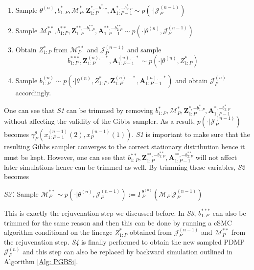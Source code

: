 \documentclass[12pt,a4paper]{article}
\begin{document}
\begin{enumerate}[label=\textit{S\arabic*.},leftmargin=*]
    \item Sample \(\theta^{(n)},b_{1:P}^{*},\mathcal{M}_{P}^{*},\mathbf{Z}_{1:P}^{*,-b_{1:P}^{*}},\mathbf{A}_{1:P-1}^{*,-b_{2:P}^{*}} \sim p(\cdot|\mathcal{J}_P^{(n-1)})\)
    \item Sample \(\mathcal{M}_{P}^{**},b_{1:P}^{**},\mathbf{Z}_{1:P}^{**,-b_{1:P}^{**}},\mathbf{A}_{1:P-1}^{**,-b_{2:P}^{**}} \sim p(\cdot|\theta^{(n)},\mathcal{J}_{P}^{(n-1)})\)
    \item Obtain \(Z_{1:P}^{*}\) from \(\mathcal{M}_{P}^{**}\) and \(\mathcal{J}_{P}^{(n-1)}\) and sample \[b_{1:P}^{***},\mathbf{Z}_{1:P}^{(n),-*},\mathbf{A}_{1:P-1}^{(n),-*} \sim p(\cdot|\theta^{(n)},Z_{1:P}^{*})\]
    \item Sample \(b_{1:P}^{(n)} \sim p(\cdot|\theta^{(n)},Z_{1:P}^{*},\mathbf{Z}_{1:P}^{(n),-*},\mathbf{A}_{1:P-1}^{(n),-*})\) and obtain \(\mathcal{J}_{P}^{(n)}\) accordingly. 
\end{enumerate}
One can see that \textit{S1} can be trimmed by removing \(b_{1:P}^{*},\mathcal{M}_{P}^{*},\mathbf{Z}_{1:P}^{*,-b_{1:P}^{*}},\mathbf{A}_{1:P-1}^{*,-b_{2:P}^{*}}\) without affecting the validity of the Gibbs sampler. As a result, \(p(\cdot|\mathcal{J}_P^{(n-1)})\) becomes \(\gamma_P^{\theta}(x_{1:P-1}^{(n-1)}(2),x_P^{(n-1)}(1))\). \textit{S1} is important to make sure that the resulting Gibbs sampler converges to the correct stationary distribution hence it must be kept. However, one can see that \(b_{1:P}^{**},\mathbf{Z}_{1:P}^{**,-b_{1:P}^{**}},\mathbf{A}_{1:P-1}^{**,-b_{2:P}^{**}}\) will not affect later simulations hence can be trimmed as well. By trimming these variables, \textit{S2} becomes

\textit{S2'.} Sample \(\mathcal{M}_P^{**} \sim p(\cdot|\theta^{(n)},\mathcal{J}_P^{(n-1)}):=\Gamma_P^{\theta^{(n)}}(\mathcal{M}_P|\mathcal{J}_{P}^{(n-1)})\)

This is exactly the rejuvenation step we discussed before. In \textit{S3}, \(b_{1:P}^{***}\) can also be trimmed for the same reason and then this can be done by running a cSMC algorithm conditional on the lineage \(Z_{1:P}^{*}\) obtained from \(\mathcal{J}_{P}^{(n-1)}\) and \(\mathcal{M}_P^{**}\) from the rejuvenation step. \textit{S4} is finally performed to obtain the new sampled PDMP \(\mathcal{J}_P^{(n)}\) and this step can also be replaced by backward simulation outlined in Algorithm \ref{Alg: PGBSi}. 
\end{document}
